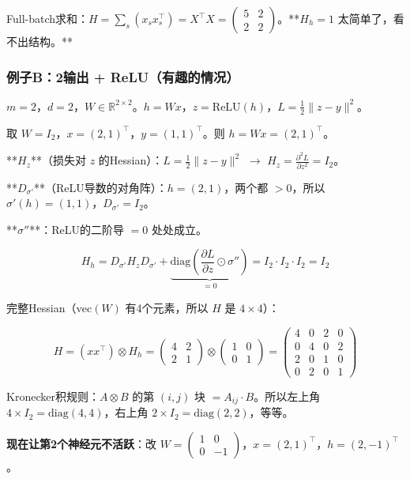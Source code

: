 \documentclass[12pt,a4paper]{article}
\begin{document}
Full-batch求和：$H = \sum_s (x_s x_s^\top) = X^\top X = \begin{pmatrix}5&2\\2&2\end{pmatrix}$。**$H_h = 1$ 太简单了，看不出结构。**


\subsubsection{例子B：2输出 + ReLU（有趣的情况）}

$m = 2$，$d = 2$，$W \in \mathbb{R}^{2 \times 2}$。$h = Wx$，$z = \text{ReLU}(h)$，$L = \frac{1}{2}\|z - y\|^2$。

取 $W = I_2$，$x = (2, 1)^\top$，$y = (1, 1)^\top$。则 $h = Wx = (2, 1)^\top$。

**$H_z$**（损失对 $z$ 的Hessian）：$L = \frac{1}{2}\|z-y\|^2$ $\to$ $H_z = \frac{\partial^2 L}{\partial z^2} = I_2$。

**$D_{\sigma'}$**（ReLU导数的对角阵）：$h = (2, 1)$，两个都 $> 0$，所以 $\sigma'(h) = (1, 1)$，$D_{\sigma'} = I_2$。

**$\sigma''$**：ReLU的二阶导 $= 0$ 处处成立。


\[H_h = D_{\sigma'} H_z D_{\sigma'} + \underbrace{\text{diag}(\frac{\partial L}{\partial z} \odot \sigma'')}_{= 0} = I_2 \cdot I_2 \cdot I_2 = I_2\]

完整Hessian（$\text{vec}(W)$ 有4个元素，所以 $H$ 是 $4 \times 4$）：


\[H = (xx^\top) \otimes H_h = \begin{pmatrix}4&2\\2&1\end{pmatrix} \otimes \begin{pmatrix}1&0\\0&1\end{pmatrix} = \begin{pmatrix}4&0&2&0\\0&4&0&2\\2&0&1&0\\0&2&0&1\end{pmatrix}\]

Kronecker积规则：$A \otimes B$ 的第 $(i,j)$ 块 $= A_{ij} \cdot B$。所以左上角 $4 \times I_2 = \text{diag}(4,4)$，右上角 $2 \times I_2 = \text{diag}(2,2)$，等等。

\textbf{现在让第2个神经元不活跃}：改 $W = \begin{pmatrix}1&0\\0&-1\end{pmatrix}$，$x = (2,1)^\top$，$h = (2, -1)^\top$。
\end{document}
